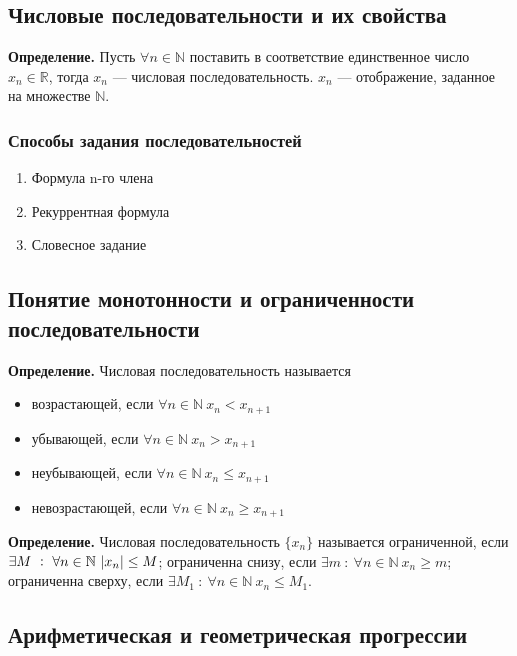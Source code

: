 \documentclass{article}
\begin{document}
    \subsection{Числовые последовательности и их свойства}
    
    \textbf{Определение.} Пусть \(\forall n \in \mathbb{N}\) поставить в соответствие единственное число \(x_n \in \mathbb{R}\), тогда \(x_n\) --- числовая последовательность. \(x_n\) --- отображение, заданное на множестве \(\mathbb{N}\).
    
    \subsubsection{Способы задания последовательностей}
    
    \begin{enumerate}
    	\item Формула n-го члена
        \item Рекуррентная формула
        \item Словесное задание
    \end{enumerate}
    
    \subsection{Понятие монотонности и ограниченности последовательности}
    
    \textbf{Определение.} Числовая последовательность называется
    \begin{itemize}
    	\item возрастающей, если \(\forall n \in \mathbb{N}\ x_n < x_{n+1}\)
        \item убывающей, если \(\forall n \in \mathbb{N}\ x_n > x_{n+1}\)
        \item неубывающей, если \(\forall n \in \mathbb{N}\ x_n \leq x_{n+1}\)
        \item невозрастающей, если \(\forall n \in \mathbb{N}\ x_n \geq x_{n+1}\)
  	\end{itemize}
    
    \textbf{Определение.} Числовая последовательность \(\{x_n\}\) называется ограниченной, если \(\exists M\ :\ \forall n \in \mathbb{N}\ \abs{x_n} \leq M\); ограниченна снизу, если \(\exists m\ :\ \forall n \in \mathbb{N}\ x_n \geq m\); ограниченна сверху, если \(\exists M_1\ :\ \forall n \in \mathbb{N}\ x_n \leq M_1\).
    
    \subsection{Арифметическая и геометрическая прогрессии}
    
\end{document}
